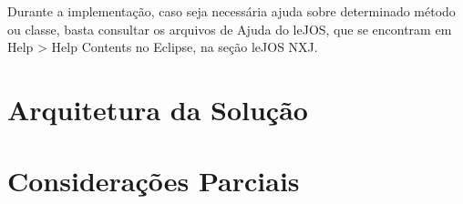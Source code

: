 	Durante a implementação, caso seja necessária ajuda sobre determinado método ou classe, basta consultar os arquivos de Ajuda do leJOS, que se encontram em
	Help > Help Contents no Eclipse, na seção leJOS NXJ.

\section{Arquitetura da Solução}

\section{Considerações Parciais}
